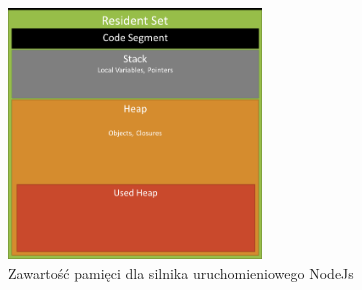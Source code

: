 \begin{figure}[h]
  \centering
  \includegraphics[width=0.6\textwidth]{Figures/memoryUsage.png}
  \caption{Zawartość pamięci dla silnika uruchomieniowego NodeJs \cite{memoryUsageImage}}
  \label{fig:memory}
\end{figure}
